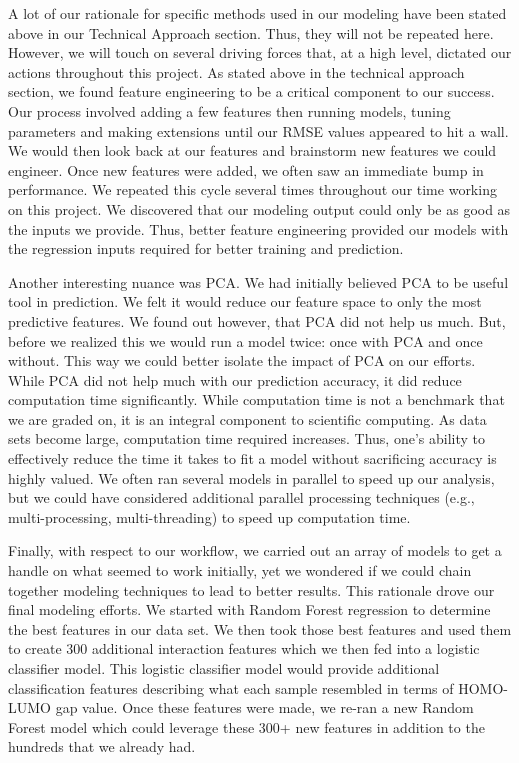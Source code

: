 \documentclass[11pt, oneside]{article}   	%
\begin{document}
A lot of our rationale for specific methods used in our modeling have been stated above in our Technical Approach section. Thus, they will not be repeated here. However, we will touch on several driving forces that, at a high level, dictated our actions throughout this project. As stated above in the technical approach section, we found feature engineering to be a critical component to our success. Our process involved adding a few features then running models, tuning parameters and making extensions until our RMSE values appeared to hit a wall. We would then look back at our features and brainstorm new features we could engineer. Once new features were added, we often saw an immediate bump in performance. We repeated this cycle several times throughout our time working on this project. We discovered that our modeling output could only be as good as the inputs we provide. Thus, better feature engineering provided our models with the regression inputs required for better training and prediction. 

Another interesting nuance was PCA. We had initially believed PCA to be useful tool in prediction. We felt it would reduce our feature space to only the most predictive features. We found out however, that PCA did not help us much. But, before we realized this we would run a model twice: once with PCA and once without. This way we could better isolate the impact of PCA on our efforts. While PCA did not help much with our prediction accuracy, it did reduce computation time significantly. While computation time is not a benchmark that we are graded on, it is an integral component to scientific computing. As data sets become large, computation time required increases. Thus, one's ability to effectively reduce the time it takes to fit a model without sacrificing accuracy is highly valued. We often ran several models in parallel to speed up our analysis, but we could have considered additional parallel processing techniques (e.g., multi-processing, multi-threading) to speed up computation time.

Finally, with respect to our workflow, we carried out an array of models to get a handle on what seemed to work initially, yet we wondered if we could chain together modeling techniques to lead to better results. This rationale drove our final modeling efforts. We started with Random Forest regression to determine the best features in our data set. We then took those best features and used them to create 300 additional interaction features which we then fed into a logistic classifier model. This logistic classifier model would provide additional classification features describing what each sample resembled in terms of HOMO-LUMO gap value. Once these features were made, we re-ran a new Random Forest model which could leverage these 300+ new features in addition to the hundreds that we already had. 
\end{document}
